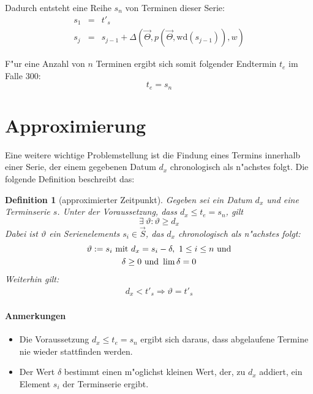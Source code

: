 \documentclass[a4paper]{article}
\numberwithin{equation}{section}
\newtheorem{dfn}{Definition}
\begin{document}
Dadurch entsteht eine Reihe $s_n$ von Terminen dieser Serie:
\begin{eqnarray}
s_1 & = & t'_s \\
s_{j} & = & s_{j-1} + \Delta(\vec{\Theta}, p(\vec{\Theta}, \textrm{wd}(s_{j-1})), w)
\end{eqnarray}

\noindent F"ur eine Anzahl von $n$ Terminen ergibt sich somit folgender
Endtermin $t_e$ im Falle 300:
\begin{equation}
\label{eqn:sn300}t_e = s_n
\end{equation}



%
%
%
%
\section{Approximierung}
Eine weitere wichtige Problemstellung ist die Findung eines Termins innerhalb
einer Serie, der einem gegebenen Datum $d_x$ chronologisch als n"achstes folgt.
Die folgende Definition beschreibt das:
\begin{dfn}[approximierter Zeitpunkt]\label{def:approx}
  Gegeben sei ein Datum $d_x$ und eine Terminserie $s$. Unter der Voraussetzung,
  dass $d_x \le t_e = s_n$, gilt
  \begin{equation}\exists\ \vartheta : \vartheta \ge d_x\end{equation}
  Dabei ist $\vartheta$ ein Serienelements $s_i \in \vec{S}$, das $d_x$
  chronologisch als n"achstes folgt:
  \begin{gather}\label{eqn:approxGeneral}
    \vartheta := s_i \textnormal{ mit } d_x = s_i - \delta,\ 1 \le i \le n
      \textnormal{ und} \\
    \delta \ge 0 \textnormal{ und } \lim \delta = 0
  \end{gather}
  Weiterhin gilt:
  \begin{eqnarray}\label{eqn:approxEasy}
    d_x < t'_s \Rightarrow \vartheta = t'_s
  \end{eqnarray}
\end{dfn}

\paragraph{Anmerkungen}
\begin{itemize}
\item Die Voraussetzung $d_x \le t_e = s_n$ ergibt sich daraus, dass abgelaufene
  Termine nie wieder stattfinden werden.
\item Der Wert $\delta$ bestimmt einen m"oglichst kleinen Wert, der, zu $d_x$
  addiert, ein Element $s_i$ der Terminserie ergibt.
\end{itemize}
\end{document}
